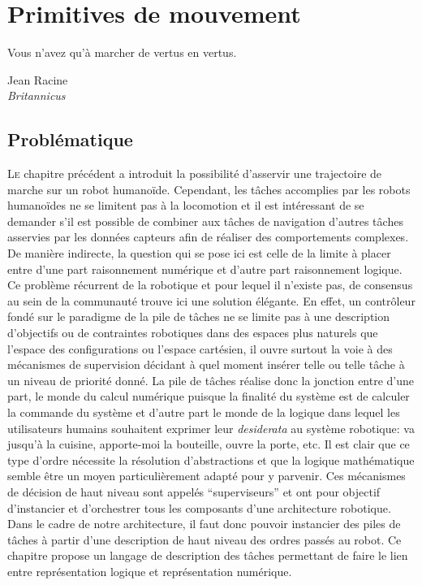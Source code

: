 \chapter{Primitives de mouvement}
\label{chap:primitive}

\epigraph{Vous n'avez qu'à marcher de vertus en vertus.}{Jean
  Racine\\\emph{Britannicus}}
\clearpage

\section{Problématique}

\lettrine[lines=2, lraise=0.1, nindent=0em, slope=-.5em]%
{L}{e} chapitre précédent a introduit la possibilité d'asservir une
trajectoire de marche sur un robot humanoïde. Cependant, les tâches
accomplies par les robots humanoïdes ne se limitent pas à la
locomotion et il est intéressant de se demander s'il est possible de
combiner aux tâches de navigation d'autres tâches asservies par les
données capteurs afin de réaliser des comportements complexes. De
manière indirecte, la question qui se pose ici est celle de la limite
à placer entre d'une part raisonnement numérique et d'autre part
raisonnement logique. Ce problème récurrent de la robotique et pour
lequel il n'existe pas, de consensus au sein de la communauté trouve
ici une solution élégante. En effet, un contrôleur fondé sur le
paradigme de la pile de tâches ne se limite pas
à une description d'objectifs ou de contraintes robotiques dans des
espaces plus naturels que l'espace des configurations ou l'espace
cartésien, il ouvre surtout la voie à des mécanismes de supervision
décidant à quel moment insérer telle ou telle tâche à un niveau de
priorité donné. La pile de tâches réalise donc la jonction entre d'une
part, le monde du calcul numérique puisque la finalité du système est
de calculer la commande du système et d'autre part le monde de la
logique dans lequel les utilisateurs humains souhaitent exprimer leur
\emph{desiderata} au système robotique: va jusqu'à la cuisine,
apporte-moi la bouteille, ouvre la porte, etc. Il est clair que ce
type d'ordre nécessite la résolution d'abstractions et que la logique
mathématique semble être un moyen particulièrement adapté pour y
parvenir. Ces mécanismes de décision de haut niveau sont appelés
``superviseurs'' et ont pour objectif d'instancier et d'orchestrer
tous les composants d'une architecture robotique. Dans le cadre de
notre architecture, il faut donc pouvoir instancier des piles de
tâches à partir d'une description de haut niveau des ordres passés au
robot. Ce chapitre propose un langage de description des tâches
permettant de faire le lien entre représentation logique et
représentation numérique.


